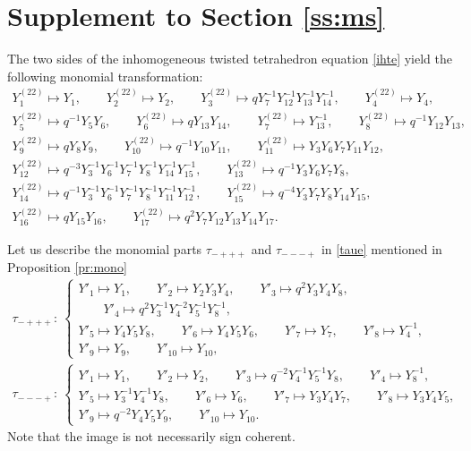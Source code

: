 \documentclass[11pt]{article}
\numberwithin{equation}{section}
\numberwithin{equation}{section}
\begin{document}
\setcounter{section}{0}
\appendix

\section[Supplement to Section 3.4]{Supplement to Section \ref{ss:ms}}\label{ap:sup}

The two sides of the inhomogeneous twisted tetrahedron equation \eqref{ihte} yield the
following monomial transformation:
\begin{gather}
Y^{(22)}_1 \mapsto Y_1, \qquad
Y^{(22)}_2 \mapsto Y_2, \qquad
Y^{(22)}_3 \mapsto qY^{-1}_{7}Y^{-1}_{12}Y^{-1}_{13}Y^{-1}_{14},\qquad
Y^{(22)}_4 \mapsto Y_4,\nonumber
\\
Y^{(22)}_5 \mapsto q^{-1}Y_5Y_6, \qquad
Y^{(22)}_6 \mapsto q Y_{13}Y_{14}, \qquad
Y^{(22)}_7 \mapsto Y^{-1}_{13},\qquad
Y^{(22)}_{8} \mapsto q^{-1}Y_{12}Y_{13},\nonumber\\
Y^{(22)}_{9} \mapsto qY_{8}Y_{9},
\qquad
Y^{(22)}_{10} \mapsto q^{-1}Y_{10}Y_{11}, \qquad
Y^{(22)}_{11} \mapsto Y_3Y_6Y_7Y_{11}Y_{12},\nonumber\\
Y^{(22)}_{12} \mapsto q^{-3}Y^{-1}_{3}Y^{-1}_{6}Y^{-1}_{7}Y^{-1}_{8}Y^{-1}_{14}Y^{-1}_{15},
\qquad
Y^{(22)}_ {13} \mapsto q^{-1}Y_3Y_6Y_7Y_8,\nonumber\\
Y^{(22)}_{14} \mapsto q^{-1}Y^{-1}_{3}Y^{-1}_{6}Y^{-1}_{7}Y^{-1}_{8}Y^{-1}_{11}Y^{-1}_{12},\qquad
Y^{(22)}_ {15} \mapsto q^{-4}Y_3Y_7Y_8Y_{14}Y_{15},\nonumber\\
Y^{(22)}_{16} \mapsto qY_{15}Y_{16},\qquad
Y^{(22)}_{17} \mapsto q^{2}Y_7Y_{12}Y_{13}Y_{14}Y_{17}.\label{y22}
\end{gather}

Let us describe the monomial parts $\tau_{-+++}$ and $\tau_{---+}$ in \eqref{taue} mentioned
in Proposition \ref{pr:mono}
\begin{gather*}
\tau_{-+++}\colon\
\begin{cases}
Y'_1 \mapsto Y_1,\qquad
Y'_2 \mapsto Y_2Y_3Y_4, \qquad
Y'_3 \mapsto q^2Y_3Y_4Y_8, \\ \qquad
Y'_4 \mapsto q^2Y^{-1}_3Y^{-2}_4Y^{-1}_5Y^{-1}_8,
\\
Y'_5 \mapsto Y_4Y_5Y_8, \qquad
Y'_6 \mapsto Y_4 Y_5 Y_6,\qquad
Y'_7 \mapsto Y_7,\qquad
Y'_8 \mapsto Y^{-1}_4,
\\
Y'_9 \mapsto Y_9, \qquad
Y'_{10} \mapsto Y_{10},
\end{cases}
\\
 \tau_{---+}\colon\
\begin{cases}
Y'_1 \mapsto Y_1,\qquad
Y'_2 \mapsto Y_2, \qquad
Y'_3 \mapsto q^{-2}Y^{-1}_4Y^{-1}_5Y_8, \qquad
Y'_4 \mapsto Y^{-1}_8, \qquad
\\
Y'_5 \mapsto Y^{-1}_3Y^{-1}_4Y_8, \qquad
Y'_6 \mapsto Y_6,\qquad
Y'_7 \mapsto Y_3Y_4Y_7,\qquad
Y'_8 \mapsto Y_3Y_4Y_5,
\\
Y'_9 \mapsto q^{-2} Y_4Y_5Y_9, \qquad
Y'_{10} \mapsto Y_{10}.
\end{cases}
\end{gather*}
Note that the image is not necessarily sign coherent.
\end{document}
